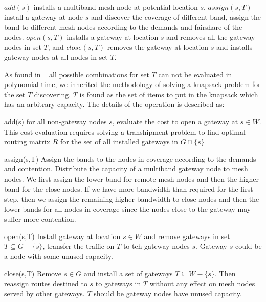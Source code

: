 $add(s)$ installs a multiband mesh node at potential location $s$, $assign(s,T)$ install a gateway at node $s$ and discover the coverage of different band, assign the band to different mesh nodes according to the demands and fairshare of the nodes. $open(s,T)$ installs a gateway at location $s$ and removes all the gateway nodes in set $T$, and $close(s,T)$ removes the gateway at location $s$ and installs gateway nodes at all nodes in set $T$.

As found in ~\cite{robinson2008adding} all possible combinations for set $T$ can not be evaluated in polynomial time, we inherited the methodology of solving a knapsack problem for the set $T$ discovering. $T$ is found as the set of items to put in the knapsack which has an arbitrary capacity.
The details of the operation is described as:

add(s) for all non-gateway nodes $s$, evaluate the cost to open a gateway at $s \in W$. This cost evaluation requires solving a transhipment problem to find optimal routing matrix $R$ for the set of all installed gateways in $G \cap \{s\}$

assign(s,T) Assign the bands to the nodes in coverage according to the demands and contention. Distribute the capacity of a multiband gateway node to mesh nodes. 
We first assign the lower band for remote mesh nodes and then the higher band for the close nodes. If we have more bandwidth than required for the first step, then we assign the remaining higher bandwidth to close nodes and then the lower bands for all nodes in coverage since the nodes close to the gateway may suffer more contention.

 
open(s,T) Install gateway at location $s \in W$ and remove gateways in set $T \subseteq G-\{s\}$, transfer the traffic on $T$ to teh gateway nodes $s$. Gateway $s$ could be a node with some unused capacity.

close(s,T) Remove $s \in G$ and install a set of gateways $T \subseteq W-\{s\}$. Then reassign routes destined to $s$ to gateways in $T$ without any effect on mesh nodes served by other gateways. $T$ should be gateway nodes have unused capacity.


